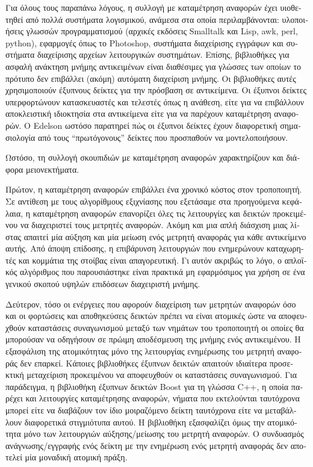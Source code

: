 \begin{greek}
Για όλους τους παραπάνω λόγους, η συλλογή με καταμέτρηση
αναφορών έχει υιοθετηθεί από πολλά συστήματα λογισμικού,
ανάμεσα στα οποία περιλαμβάνονται: υλοποιήσεις γλωσσών
προγραμματισμού (αρχικές εκδόσεις Smalltalk και Lisp, awk,
perl, python), εφαρμογές όπως το Photoshop, συστήματα
διαχείρισης εγγράφων και συστήματα διαχείρισης αρχείων
λειτουργικών συστημάτων. Επίσης, βιβλιοθήκες για ασφαλή
ανάκτηση μνήμης αντικειμένων είναι διαθέσιμες για γλώσσες
των οποίων το πρότυπο δεν επιβάλλει (ακόμη) αυτόματη
διαχείριση μνήμης. Οι βιβλιοθήκες αυτές χρησιμοποιούν
έξυπνους δείκτες για την πρόσβαση σε αντικείμενα. Οι
έξυπνοι δείκτες υπερφορτώνουν κατασκευαστές και τελεστές
όπως η ανάθεση, είτε για να επιβάλλουν αποκλειστική ιδιοκτησία
στα αντικείμενα είτε για να παρέχουν καταμέτρηση αναφορών.
Ο Edelson \cite{DBLP:conf/iwmm/Edelson92} ωστόσο παρατηρεί
πώς οι έξυπνοι δείκτες έχουν διαφορετική σημασιολογία από
τους ``πρωτόγονους'' δείκτες που προσπαθούν να μοντελοποιήσουν.

Ωστόσο, τη συλλογή σκουπιδιών με καταμέτρηση αναφορών
χαρακτηρίζουν και διάφορα μειονεκτήματα.

Πρώτον, η καταμέτρηση αναφορών επιβάλλει ένα χρονικό κόστος
στον τροποποιητή. Σε αντίθεση με τους αλγορίθμους εξιχνίασης
που εξετάσαμε στα προηγούμενα κεφάλαια, η καταμέτρηση αναφορών
επανορίζει όλες τις λειτουργίες \textenglish{} και
\textenglish{} δεικτών προκειμένου να διαχειριστεί τους
μετρητές αναφορών. Ακόμη και μια απλή διάσχιση μιας λίστας
απαιτεί μία αύξηση και μία μείωση ενός μετρητή αναφοράς για
κάθε αντικείμενο αυτής. Από άποψη επίδοσης, η επιβάρυνση
λειτουργιών που ενημερώνουν καταχωρητές και κομμάτια της
στοίβας είναι απαγορευτική. Γι αυτόν ακριβώς το λόγο, ο
απλοϊκός αλγόριθμος που παρουσιάστηκε είναι πρακτικά μη
εφαρμόσιμος για χρήση σε ένα γενικού σκοπού υψηλών επιδόσεων
διαχειριστή μνήμης.

Δεύτερον, τόσο οι ενέργειες που αφορούν διαχείριση των μετρητών
αναφορών όσο και οι φορτώσεις και αποθηκεύσεις δεικτών πρέπει
να είναι ατομικές ώστε να αποφευχθούν καταστάσεις συναγωνισμού
μεταξύ των νημάτων του τροποποιητή οι οποίες θα μπορούσαν να
οδηγήσουν σε πρώιμη αποδέσμευση της μνήμης ενός αντικειμένου.
Η εξασφάλιση της ατομικότητας μόνο της λειτουργίας ενημέρωσης
του μετρητή αναφοράς δεν επαρκεί. Κάποιες βιβλιοθήκες έξυπνων
δεικτών απαιτούν ιδιαίτερα προσεκτική μεταχείριση προκειμένου
να αποφευχθούν οι καταστάσεις συναγωνισμού. Για παράδειγμα,
η βιβλιοθήκη έξυπνων δεικτών Boost για τη γλώσσα C++, η οποία
παρέχει και λειτουργίες καταμέτρησης αναφορών, νήματα που
εκτελούνται ταυτόχρονα μπορεί είτε να διαβάζουν τον ίδιο
μοιραζόμενο δείκτη ταυτόχρονα είτε να μεταβάλλουν διαφορετικά
στιγμιότυπα αυτού. Η βιβλιοθήκη εξασφαλίζει όμως την
ατομικότητα μόνο των λειτουργιών αύξησης/μείωσης του μετρητή
αναφορών. Ο συνδυασμός ανάγνωσης/εγγραφής ενός δείκτη με την
ενημέρωση ενός μετρητή αναφοράς δεν αποτελεί μία μοναδική
ατομική πράξη.


\end{greek}
